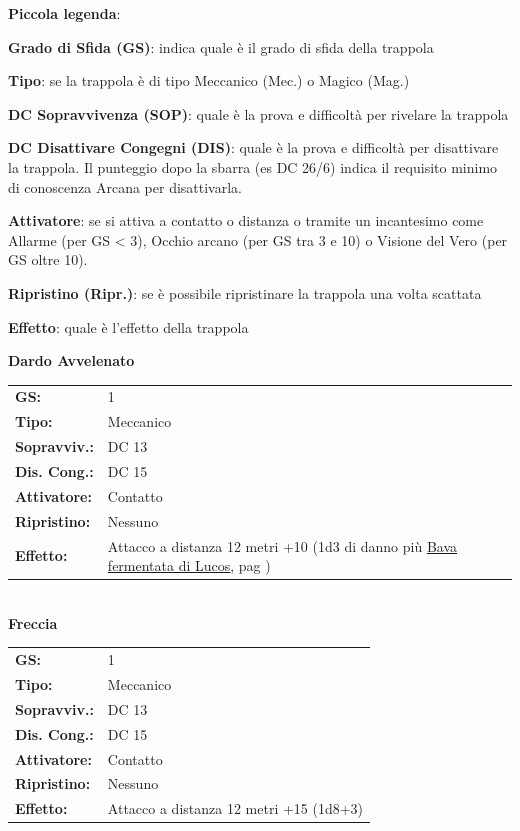 \begin{multicols}{2}
\medskip

\textbf{Piccola legenda}:

\textbf{Grado di Sfida (GS)}: indica quale è il grado di sfida della trappola

\textbf{Tipo}: se la trappola è di tipo Meccanico (Mec.) o Magico (Mag.)

\textbf{DC Sopravvivenza (SOP)}: quale è la prova e difficoltà per rivelare la trappola

\textbf{DC Disattivare Congegni (DIS)}: quale è la prova e difficoltà per disattivare la trappola. Il punteggio dopo la sbarra (es DC 26/6) indica il requisito minimo di conoscenza Arcana per disattivarla.

\textbf{Attivatore}: se si attiva a contatto o distanza o tramite un incantesimo come Allarme (per GS < 3), Occhio arcano (per GS tra 3 e 10) o Visione del Vero (per GS oltre 10).

\textbf{Ripristino (Ripr.)}: se è possibile ripristinare la trappola una volta scattata

\textbf{Effetto}: quale è l'effetto della trappola

\bigskip

\textbf{Dardo Avvelenato}

\begin{tabularx}{0.48\textwidth}{lX}
	\textbf{GS:} & 1 \\
	\textbf{Tipo:} & Meccanico \\
	\textbf{Sopravviv.:} & DC 13 \\
	\textbf{Dis. Cong.:} & DC 15 \\
	\textbf{Attivatore:} & Contatto \\
	\textbf{Ripristino:} & Nessuno \\
	\textbf{Effetto:} & Attacco a distanza 12 metri +10 (1d3 di danno più \hyperlink{bavadilucos}{Bava fermentata di Lucos}, pag \pageref{bavadilucos})
\end{tabularx}\\

\textbf{Freccia}

\begin{tabularx}{0.48\textwidth}{lX}
	\textbf{GS:} & 1 \\
	\textbf{Tipo:} & Meccanico \\
	\textbf{Sopravviv.:} & DC 13 \\
	\textbf{Dis. Cong.:} & DC 15 \\
	\textbf{Attivatore:} & Contatto \\
	\textbf{Ripristino:} & Nessuno \\
	\textbf{Effetto:} & Attacco a distanza 12 metri +15 (1d8+3)
\end{tabularx}\\


\end{multicols}
